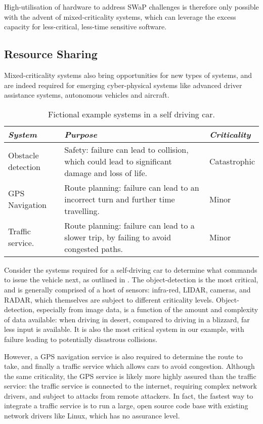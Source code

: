 High-utilisation of hardware to address SWaP challenges is therefore only possible with the advent
of mixed-criticality systems, which can leverage the excess capacity for less-critical, less-time
sensitive software.

\subsection{Resource Sharing}

Mixed-criticality systems also bring opportunities for new types of
systems, and are indeed required for emerging cyber-physical systems like
advanced driver assistance systems, autonomous vehicles and aircraft.

\begin{table} 
\centering
\begin{tabularx}{\textwidth}{lXl}\toprule
    \emph{System}            & \emph{Purpose}                                                           & \emph{Criticality} \\\midrule
     Obstacle detection      & Safety: failure can lead to collision, which could lead to significant
    damage and loss of life. & Catastrophic    \\
    \gls{GPS} Navigation          & Route planning:  failure can lead to an incorrect turn and further
    time travelling.         & Minor \\
     Traffic service.        & Route planning: failure can lead to a slower trip, by failing to
    avoid congested paths.
    & Minor \\
    \bottomrule
\end{tabularx}
\caption{Fictional example systems in a self driving car.}
\label{tab:self-driving-car}
\end{table}

Consider the systems required for a self-driving car to determine what commands to issue the vehicle
next, as outlined in . The object-detection is the most critical, and is
generally comprised of a host of sensors: infra-red, LIDAR, cameras, and RADAR, which themselves
are subject to different criticality levels. Object-detection,
especially from image data, is a function of the amount and complexity of data available: when
driving in desert, compared to driving in a blizzard, far less input is available. It is also the
most critical system in our example, with failure leading to potentially disastrous collisions.

However, a GPS navigation service is also required to determine the route to take, and finally a
traffic service which allows cars to avoid congestion. Although the same criticality, the GPS
service is likely more highly assured than the traffic service: the traffic service is connected to
the internet, requiring complex network drivers, and subject to attacks from remote attackers. 
In fact, the fastest way to integrate a traffic service is to run a large, open source code base
with existing network drivers like Linux, which has no assurance level. 

